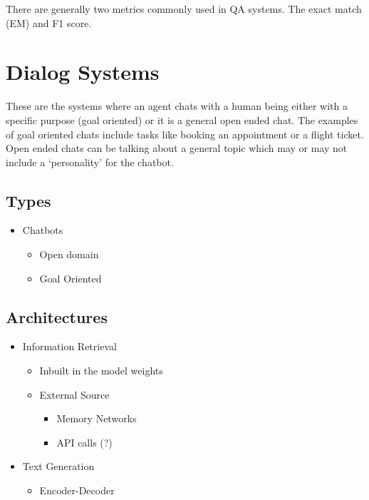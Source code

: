 \documentclass[]{krantz}
\providecommand{\tightlist}{%
  \setlength{\itemsep}{0pt}\setlength{\parskip}{0pt}}
\begin{document}
There are generally two metrics commonly used in QA systems. The exact match (EM) and F1 score.

\hypertarget{dialog-systems}{%
\section{Dialog Systems}\label{dialog-systems}}

These are the systems where an agent chats with a human being either with a specific purpose (goal oriented) or it is a general open ended chat. The examples of goal oriented chats include tasks like booking an appointment or a flight ticket. Open ended chats can be talking about a general topic which may or may not include a `personality' for the chatbot.

\hypertarget{types-1}{%
\subsection{Types}\label{types-1}}

\begin{itemize}
\tightlist
\item
  Chatbots

  \begin{itemize}
  \tightlist
  \item
    Open domain
  \item
    Goal Oriented
  \end{itemize}
\end{itemize}

\hypertarget{architectures-1}{%
\subsection{Architectures}\label{architectures-1}}

\begin{itemize}
\tightlist
\item
  Information Retrieval

  \begin{itemize}
  \tightlist
  \item
    Inbuilt in the model weights
  \item
    External Source

    \begin{itemize}
    \tightlist
    \item
      Memory Networks
    \item
      API calls (?)
    \end{itemize}
  \end{itemize}
\item
  Text Generation

  \begin{itemize}
  \tightlist
  \item
    Encoder-Decoder
  \end{itemize}
\end{itemize}
\end{document}

